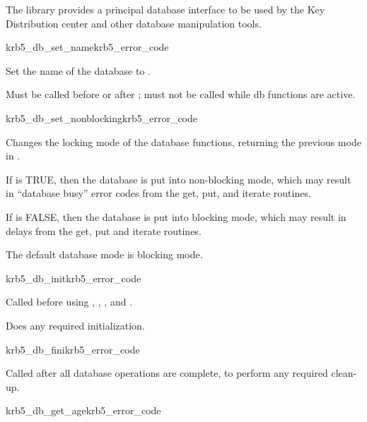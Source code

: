 The  library provides a principal database interface
to be used by the Key Distribution center and other database
manipulation tools.


\begin{funcdecl}{krb5_db_set_name}{krb5_error_code}{\funcin}
\end{funcdecl}

Set the name of the database to .  

Must be called before  or after
; must not be called while db functions are active.

\begin{funcdecl}{krb5_db_set_nonblocking}{krb5_error_code}{\funcin}
\funcout
{}
\end{funcdecl}

Changes the locking mode of the database functions, returning the previous
mode in .

If  is TRUE, then the database is put into
non-blocking mode, which may result in ``database busy'' error codes from
the get, put, and iterate routines.

If  is FALSE, then the database is put into blocking mode,
which may result in delays from the get, put and iterate routines.

The default database mode is blocking mode.

\begin{funcdecl}{krb5_db_init}{krb5_error_code}{\funcvoid}
\end{funcdecl}

Called before using ,
, , and
.

Does any required initialization.


\begin{funcdecl}{krb5_db_fini}{krb5_error_code}{\funcvoid}
\end{funcdecl}

Called after all database operations are complete, to perform any required
clean-up.



\begin{funcdecl}{krb5_db_get_age}{krb5_error_code}{\funcin}
\funcout
{}
\end{funcdecl}

